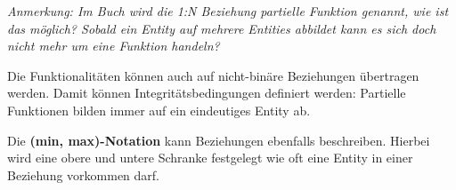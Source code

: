 \documentclass[a4paper, oneside]{book}
\begin{document}
  \textit{Anmerkung: Im Buch wird die 1:N Beziehung partielle Funktion genannt, wie ist das möglich?
  Sobald ein Entity auf mehrere Entities abbildet kann es sich doch nicht mehr um eine Funktion handeln?}

  Die Funktionalitäten können auch auf nicht-binäre Beziehungen übertragen werden. Damit können Integritätsbedingungen definiert werden:
  Partielle Funktionen bilden immer auf ein eindeutiges Entity ab.

  Die \textbf{(min, max)-Notation} kann Beziehungen ebenfalls beschreiben.
  Hierbei wird eine obere und untere Schranke festgelegt wie oft eine Entity in einer Beziehung vorkommen darf.
\end{document}

